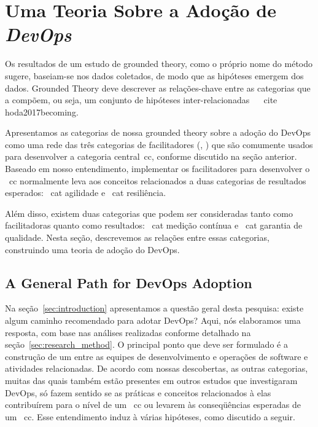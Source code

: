 \section{Uma Teoria Sobre a Adoção de \textit{DevOps}}\label{secao_teoria}

\iffalse
Os resultados de um estudo de grounded theory, como o próprio nome do método sugere, baseiam-se nos dados coletados, de modo que as hipóteses emergem dos dados.
Grounded Theory deve descrever as relações-chave entre as
categorias que a compõem, ou seja, um conjunto de hipóteses inter-relacionadas ~ \ cite {hoda2017becoming}.

Apresentamos as categorias de nossa grounded theory sobre a adoção do DevOps como uma rede das três categorias de facilitadores  (, ) que são comumente usados para desenvolver a categoria central\ cc, conforme discutido na seção anterior.
Baseado em nosso entendimento, implementar os facilitadores para desenvolver o \ cc normalmente leva aos conceitos relacionados a duas categorias de resultados esperados:
\ cat {agilidade} e \ cat {resiliência}.

Além disso, existem duas categorias que podem ser consideradas
tanto como facilitadoras quanto como resultados: \ cat {medição contínua} e \ cat {garantia de qualidade}.
Nesta seção, descrevemos as relações entre essas categorias, construindo uma teoria
de adoção do DevOps.
\subsection{A General Path for DevOps Adoption}

Na seção~\ref{sec:introduction} apresentamos a questão geral desta
pesquisa: existe algum caminho recomendado para adotar DevOps? Aqui, nós elaboramos uma resposta,
com base nas análises realizadas conforme detalhado na seção~\ref{sec:research_method}. O principal
ponto que deve ser formulado é a construção de um \cc entre as equipes de desenvolvimento e operações de software e
atividades relacionadas. De acordo com nossas descobertas, as outras categorias,
muitas das quais também estão presentes em outros estudos que investigaram DevOps,
só fazem sentido se as práticas e conceitos relacionados à elas contribuírem para o nível de um \ cc ou levarem às conseqüências esperadas
de um \ cc. Esse entendimento induz à várias hipóteses, como discutido a seguir.


